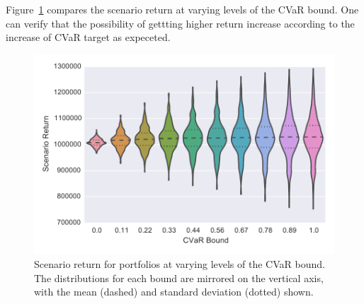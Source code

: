 Figure~\ref{fig:scenarioreturn} compares the scenario return at varying levels of the CVaR bound.
One can verify that the possibility of gettting higher return increase according to the increase of CVaR target  as expeceted.

\begin{figure}[tp]
\centering
\includegraphics{../pic/Scenario_Return.pdf}
\caption{Scenario return for portfolios at varying levels of the CVaR bound.
The distributions for each bound are mirrored on the vertical axis, with the mean (dashed) and standard deviation (dotted) shown.}
\label{fig:scenarioreturn}
\end{figure}

